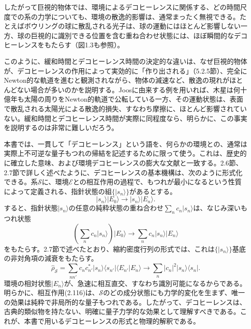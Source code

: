 したがって巨視的物体では、環境によるデコヒーレンスに関係する、どの時間尺度での系の力学についても、環境の散逸的影響は、通常まったく無視できる。たとえばボウリングの球に散乱される光子は、球の運動にはほとんど影響しない一方、球の巨視的に識別できる位置を含む重ね合わせ状態には、ほぼ瞬間的なデコヒーレンスをもたらす（図1.3も参照）。

このように、緩和時間とデコヒーレンス時間の決定的な違いは、なぜ巨視的物体が、デコヒーレンスの作用によって実効的に「作り出される」（5.2.5節）、完全にNewton的な軌道を進むと観測されながら、物体の減速など、散逸の現れがほとんどない場合が多いのかを説明する。Joosに由来する例\cite[p.~79]{ref017}を用いれば、木星は何十億年も太陽の周りをNewton的軌道で公転している一方、その運動状態は、表面で散乱される太陽光による散逸的損失、すなわち摩擦に、ほとんど影響されていない。緩和時間とデコヒーレンス時間が実際に同程度なら、明らかに、この事実を説明するのは非常に難しいだろう。

\hypertarget{srcpage:95}{}\label{srcpage:95}
本書では、一貫して「デコヒーレンス」という語を、何らかの環境との、通常は実際上不可逆な量子もつれの帰結を記述するために限って使う。これは、歴史的に確立した意味、および環境デコヒーレンスの膨大な文献と一致する。2.6節、2.7節で詳しく述べたように、デコヒーレンスの基本機構は、次のように形式化できる。系$\mathcal S$に、環境$\mathcal E$との相互作用の過程で、もつれが最小になるという性質によって定義される、指針状態の組$\{\lvert s_n\rangle\}$があるとする。
\begin{equation}\lvert s_n\rangle\lvert E_0\rangle\longrightarrow\lvert s_n\rangle\lvert E_n\rangle.\tag{2.115}\end{equation}
すると、指針状態$\lvert s_n\rangle$の任意の純粋状態の重ね合わせ$\sum_n c_n\lvert s_n\rangle$は、なじみ深いもつれ状態
\begin{equation}\left(\sum_n c_n\lvert s_n\rangle\right)\lvert E_0\rangle\longrightarrow\sum_n c_n\lvert s_n\rangle\lvert E_n\rangle\tag{2.116}\end{equation}
をもたらす。2.7節で述べたとおり、縮約密度行列の形式では、これは$\{\lvert s_n\rangle\}$基底の非対角項の減衰をもたらす。
\begin{equation}\hat\rho_{\mathcal S}=\sum_{nn'}c_nc_{n'}^*\lvert s_n\rangle\langle s_{n'}\rvert\langle E_{n'}\vert E_n\rangle\longrightarrow\sum_n\lvert c_n\rvert^2\lvert s_n\rangle\langle s_n\rvert.\tag{2.117}\end{equation}
環境の相対状態$\lvert E_n\rangle$が、急速に相互直交、すなわち識別可能になるからである。明らかに、相互作用(2.116)は、$\mathcal S$のどの成分状態にも力学的変化を生まず、唯一の効果は純粋で非局所的な量子もつれである。したがって、デコヒーレンスは、古典的類似物を持たない、明確に量子力学的な効果として理解すべきである。これが、本書で用いるデコヒーレンスの形式と物理的解釈である。

